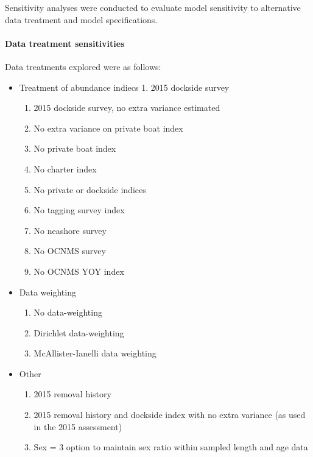 \documentclass[11pt,
  english,
  letterpaper,
]{article}
\providecommand{\tightlist}{%
  \setlength{\itemsep}{0pt}\setlength{\parskip}{0pt}}
\providecommand{\tightlist}{%
  \setlength{\itemsep}{0pt}\setlength{\parskip}{0pt}}
\begin{document}
Sensitivity analyses were conducted to evaluate model sensitivity to alternative data treatment and model specifications.

\hypertarget{data-treatment-sensitivities}{%
\paragraph{Data treatment sensitivities}\label{data-treatment-sensitivities}}

Data treatments explored were as follows:

\begin{itemize}
\tightlist
\item
  Treatment of abundance indiecs 1. 2015 dockside survey

  \begin{enumerate}
  \def\labelenumi{\arabic{enumi}.}
  \setcounter{enumi}{1}
  \tightlist
  \item
    2015 dockside survey, no extra variance estimated
  \item
    No extra variance on private boat index
  \item
    No private boat index
  \item
    No charter index
  \item
    No private or dockside indices
  \item
    No tagging survey index
  \item
    No neashore survey
  \item
    No OCNMS survey
  \item
    No OCNMS YOY index
  \end{enumerate}
\item
  Data weighting

  \begin{enumerate}
  \def\labelenumi{\arabic{enumi}.}
  \setcounter{enumi}{10}
  \tightlist
  \item
    No data-weighting
  \item
    Dirichlet data-weighting
  \item
    McAllister-Ianelli data weighting
  \end{enumerate}
\item
  Other

  \begin{enumerate}
  \def\labelenumi{\arabic{enumi}.}
  \setcounter{enumi}{13}
  \tightlist
  \item
    2015 removal history
  \item
    2015 removal history and dockside index with no extra variance (as used in the 2015 assessment)
  \item
    Sex = 3 option to maintain sex ratio within sampled length and age data
  \end{enumerate}
\end{itemize}
\end{document}
